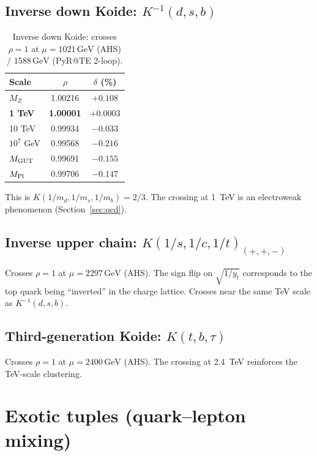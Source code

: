 \documentclass[11pt,a4paper]{article}
\newcommand{\GeV}{\,\text{GeV}}
\newcommand{\MZ}{M_Z}
\newcommand{\MPl}{M_{\rm Pl}}
\newcommand{\MGUT}{M_{\rm GUT}}
\begin{document}
\subsection{Inverse down Koide: $K^{-1}(d,s,b)$}

\begin{table}[h]
\centering
\begin{tabular}{lcc}
\toprule
Scale & $\rho$ & $\delta$ (\%) \\
\midrule
$\MZ$          & 1.00216 & $+0.108$ \\
\textbf{1 TeV} & \textbf{1.00001} & $\mathbf{+0.0003}$ \\
10 TeV         & 0.99934 & $-0.033$ \\
$10^7$ GeV     & 0.99568 & $-0.216$ \\
$\MGUT$        & 0.99691 & $-0.155$ \\
$\MPl$         & 0.99706 & $-0.147$ \\
\bottomrule
\end{tabular}
\caption{Inverse down Koide: crosses $\rho = 1$ at $\mu = 1021\GeV$ (AHS)
  / $1588\GeV$ (PyR@TE 2-loop).}
\label{tab:invdown}
\end{table}

This is $K(1/m_d, 1/m_s, 1/m_b) = 2/3$. The crossing at 1~TeV
is an electroweak phenomenon (Section~\ref{sec:qcd}).

\subsection{Inverse upper chain: $K(1/s, 1/c, 1/t)_{(+,+,-)}$}

Crosses $\rho = 1$ at $\mu = 2297\GeV$ (AHS). The sign flip on
$\sqrt{1/y_t}$ corresponds to the top quark being ``inverted'' in
the charge lattice. Crosses near the same TeV scale as $K^{-1}(d,s,b)$.

\subsection{Third-generation Koide: $K(t,b,\tau)$}

Crosses $\rho = 1$ at $\mu = 2400\GeV$ (AHS).
The crossing at 2.4~TeV reinforces the TeV-scale clustering.

\section{Exotic tuples (quark--lepton mixing)}
\label{sec:exotic}
\end{document}

